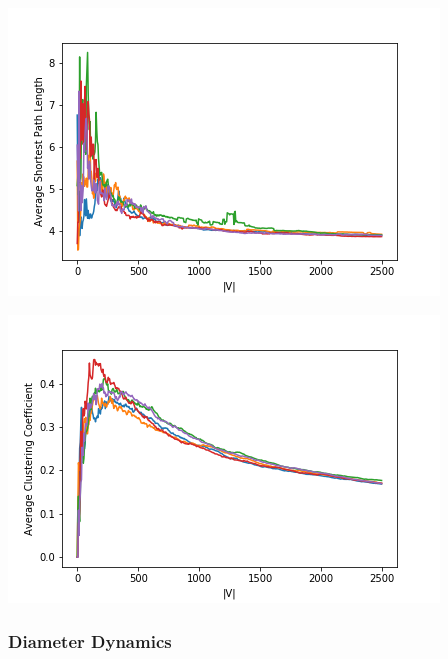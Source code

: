 \documentclass[12pt,twoside]{report}
\begin{document}
\begin{center}
\begin{minipage}{0.45\linewidth}
\includegraphics[width=\linewidth]{figures/lens.png}
\end{minipage}%
\hfill
\begin{minipage}{0.45\linewidth}
\includegraphics[width=\linewidth]{figures/clusts.png}
\end{minipage}
\end{center}

\subsubsection{Diameter Dynamics}
\end{document}
